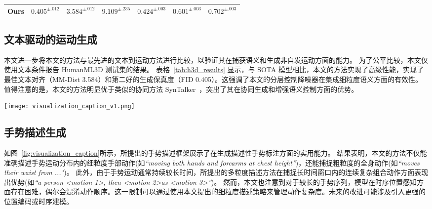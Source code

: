 \begin{table*}[t]
\begin{tabular}{c cccccc}
  Ours  & $0.405^{\pm .012}$ & $3.584^{\pm .012}$ & $9.109^{\pm .235}$  & $0.424^{\pm .003}$ &$0.601^{\pm .003}$ & $0.702^{\pm .003}$ \\
  \bottomrule
  \end{tabular}
\end{table*}

\subsection{文本驱动的运动生成}
\label{sec:exp_t2m}
本文进一步将本文的方法与最先进的文本到运动方法进行比较，以验证其在捕获语义和生成非自发运动方面的能力。
为了公平比较，本文仅使用文本条件报告 HumanML3D 测试集的结果。
表格~\ref{tab:h3d_results} 显示，与 SOTA 模型相比，本文的方法实现了高级性能，实现了最佳文本对齐（MM-Dist 3.584）和第二好的生成保真度（FID 0.405）。这强调了本文的分层控制降噪器在集成细粒度语义方面的有效性。
值得注意的是，本文的方法明显优于类似的协同方法 SynTalker~\cite{chen2024syntalker}，突出了其在协同生成和增强语义控制方面的优势。


\begin{figure*}[t]
  \centering
  \texttt{[image: visualization\_caption\_v1.png]}
  \caption{手势描述生成结果示例。生成的描述准确地描述了整体运动模式和细粒度的手势细节。}
  \label{fig:visualization_caption}
\end{figure*}
\subsection{手势描述生成}
如图~\ref{fig:visualization_caption}所示，所提出的手势描述框架展示了在生成描述性手势标注方面的实用能力。
结果表明，本文的方法不仅能准确描述手势运动分布内的细粒度手部动作(如\textit{``moving both hands and forearms at chest height''})，还能捕捉粗粒度的全身动作(如\textit{``moves their waist from ..."})。
此外，由于手势运动通常持续较长时间，所提出的多粒度描述方法在捕捉长时间窗口内的连续复杂组合动作方面表现出优势(如\textit{``a person \textless motion 1\textgreater, then \textless motion 2\textgreater as \textless motion 3\textgreater''})。
然而，本文也注意到对于较长的手势序列，模型在时序位置感知方面存在困难，偶尔会混淆动作顺序。这一限制可以通过使用本文提出的细粒度描述策略来管理动作复杂度。未来的改进可能涉及引入更强的位置编码或时序建模。

